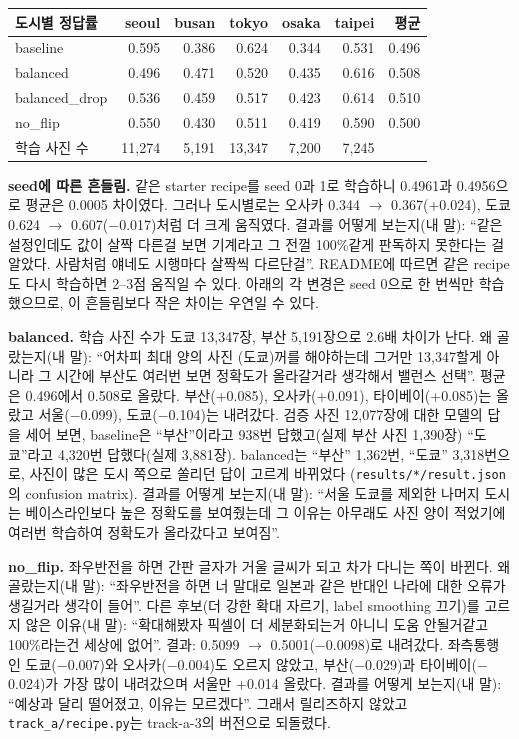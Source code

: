 \documentclass[11pt]{article}
\begin{document}
\begin{center}\footnotesize
\begin{tabular}{lrrrrrr}
\toprule
도시별 정답률 & seoul & busan & tokyo & osaka & taipei & 평균 \\
\midrule
baseline & 0.595 & 0.386 & 0.624 & 0.344 & 0.531 & 0.496 \\
balanced & 0.496 & 0.471 & 0.520 & 0.435 & 0.616 & 0.508 \\
balanced\_drop & 0.536 & 0.459 & 0.517 & 0.423 & 0.614 & 0.510 \\
no\_flip & 0.550 & 0.430 & 0.511 & 0.419 & 0.590 & 0.500 \\
\midrule
학습 사진 수 & 11,274 & 5,191 & 13,347 & 7,200 & 7,245 & \\
\bottomrule
\end{tabular}
\end{center}

\textbf{seed에 따른 흔들림.} 같은 starter recipe를 seed 0과 1로 학습하니 0.4961과 0.4956으로 평균은 0.0005 차이였다. 그러나 도시별로는 오사카 0.344 $\to$ 0.367(+0.024), 도쿄 0.624 $\to$ 0.607($-$0.017)처럼 더 크게 움직였다. 결과를 어떻게 보는지(내 말): ``같은 설정인데도 값이 살짝 다른걸 보면 기계라고 그 전껄 100\%같게 판독하지 못한다는 걸 알았다. 사람처럼 얘네도 시행마다 살짝씩 다르단걸''.
README에 따르면 같은 recipe도 다시 학습하면 2--3점 움직일 수 있다. 아래의 각 변경은 seed 0으로 한 번씩만 학습했으므로,
이 흔들림보다 작은 차이는 우연일 수 있다.

\textbf{balanced.} 학습 사진 수가 도쿄 13,347장, 부산 5,191장으로 2.6배 차이가 난다. 왜 골랐는지(내 말):
``어차피 최대 양의 사진 (도쿄)꺼를 해야하는데 그거만 13,347할게 아니라 그 시간에 부산도 여러번 보면 정확도가 올라갈거라 생각해서 밸런스 선택''.
평균은 0.496에서 0.508로 올랐다. 부산(+0.085), 오사카(+0.091), 타이베이(+0.085)는 올랐고 서울($-$0.099), 도쿄($-$0.104)는 내려갔다.
검증 사진 12,077장에 대한 모델의 답을 세어 보면, baseline은 ``부산''이라고 938번 답했고(실제 부산 사진 1,390장) ``도쿄''라고 4,320번 답했다(실제 3,881장).
balanced는 ``부산'' 1,362번, ``도쿄'' 3,318번으로, 사진이 많은 도시 쪽으로 쏠리던 답이 고르게 바뀌었다
(\texttt{results/*/result.json}의 confusion matrix). 결과를 어떻게 보는지(내 말):
``서울 도쿄를 제외한 나머지 도시는 베이스라인보다 높은 정확도를 보여줬는데 그 이유는 아무래도 사진 양이 적었기에 여러번 학습하여 정확도가 올라갔다고 보여짐''.

\textbf{no\_flip.} 좌우반전을 하면 간판 글자가 거울 글씨가 되고 차가 다니는 쪽이 바뀐다. 왜 골랐는지(내 말):
``좌우반전을 하면 너 말대로 일본과 같은 반대인 나라에 대한 오류가 생길거라 생각이 들어''.
다른 후보(더 강한 확대 자르기, label smoothing 끄기)를 고르지 않은 이유(내 말):
``확대해봤자 픽셀이 더 세분화되는거 아니니 도움 안될거같고 100\%라는건 세상에 없어''.
결과: 0.5099 $\to$ 0.5001($-$0.0098)로 내려갔다. 좌측통행인 도쿄($-$0.007)와 오사카($-$0.004)도 오르지 않았고, 부산($-$0.029)과 타이베이($-$0.024)가 가장 많이 내려갔으며 서울만 +0.014 올랐다. 결과를 어떻게 보는지(내 말): ``예상과 달리 떨어졌고, 이유는 모르겠다''. 그래서 릴리즈하지 않았고 \texttt{track\_a/recipe.py}는 track-a-3의 버전으로 되돌렸다.
\end{document}
